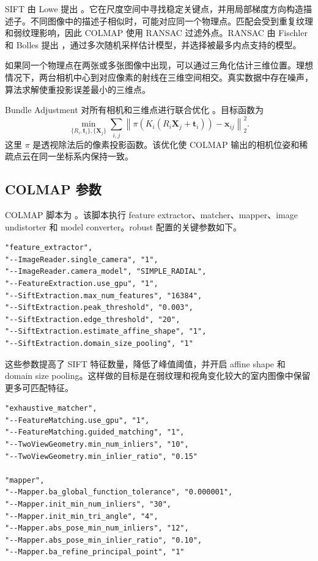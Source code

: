 \documentclass[UTF8,a4paper,11pt]{ctexart}
\newcommand{\codepath}[1]{\path{#1}}
\begin{document}
SIFT 由 Lowe 提出 \cite{lowe2004}。它在尺度空间中寻找稳定关键点，并用局部梯度方向构造描述子。不同图像中的描述子相似时，可能对应同一个物理点。匹配会受到重复纹理和弱纹理影响，因此 COLMAP 使用 RANSAC 过滤外点。RANSAC 由 Fischler 和 Bolles 提出 \cite{fischler1981}，通过多次随机采样估计模型，并选择被最多内点支持的模型。

如果同一个物理点在两张或多张图像中出现，可以通过三角化估计三维位置。理想情况下，两台相机中心到对应像素的射线在三维空间相交。真实数据中存在噪声，算法求解使重投影误差最小的三维点。

Bundle Adjustment 对所有相机和三维点进行联合优化 \cite{triggs2000}。目标函数为
\[
\min_{\{R_i,\mathbf{t}_i\},\{\mathbf{X}_j\}}
\sum_{i,j}
\left\|
\pi\left(K_i(R_i\mathbf{X}_j+\mathbf{t}_i)\right)
- \mathbf{x}_{ij}
\right\|_2^2 .
\]
这里 \(\pi\) 是透视除法后的像素投影函数。该优化使 COLMAP 输出的相机位姿和稀疏点云在同一坐标系内保持一致。

\subsection{COLMAP 参数}

COLMAP 脚本为 \codepath{scripts/run_stage2_colmap.ps1}。该脚本执行 feature extractor、matcher、mapper、image undistorter 和 model converter。robust 配置的关键参数如下。

\begin{lstlisting}[language={},caption={COLMAP robust 配置中的特征提取参数}]
"feature_extractor",
"--ImageReader.single_camera", "1",
"--ImageReader.camera_model", "SIMPLE_RADIAL",
"--FeatureExtraction.use_gpu", "1",
"--SiftExtraction.max_num_features", "16384",
"--SiftExtraction.peak_threshold", "0.003",
"--SiftExtraction.edge_threshold", "20",
"--SiftExtraction.estimate_affine_shape", "1",
"--SiftExtraction.domain_size_pooling", "1"
\end{lstlisting}

这些参数提高了 SIFT 特征数量，降低了峰值阈值，并开启 affine shape 和 domain size pooling。这样做的目标是在弱纹理和视角变化较大的室内图像中保留更多可匹配特征。

\begin{lstlisting}[language={},caption={COLMAP robust 配置中的匹配和 mapper 参数}]
"exhaustive_matcher",
"--FeatureMatching.use_gpu", "1",
"--FeatureMatching.guided_matching", "1",
"--TwoViewGeometry.min_num_inliers", "10",
"--TwoViewGeometry.min_inlier_ratio", "0.15"

"mapper",
"--Mapper.ba_global_function_tolerance", "0.000001",
"--Mapper.init_min_num_inliers", "30",
"--Mapper.init_min_tri_angle", "4",
"--Mapper.abs_pose_min_num_inliers", "12",
"--Mapper.abs_pose_min_inlier_ratio", "0.10",
"--Mapper.ba_refine_principal_point", "1"
\end{lstlisting}
\end{document}

